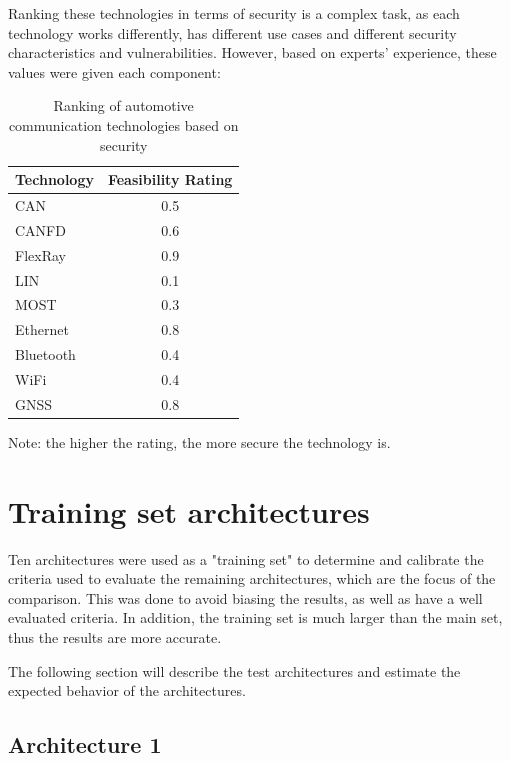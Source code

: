 Ranking these technologies in terms of security is a complex task, as each technology works differently,
has different use cases and different security characteristics and vulnerabilities.
However, based on experts' experience, these values were given each component:

\begin{table}[h]
    \centering
    \begin{tabular}{|l|c|}
    \hline
    \textbf{Technology} & \textbf{Feasibility Rating} \\
    \hline
    CAN & 0.5 \\
    CANFD & 0.6 \\
    FlexRay & 0.9 \\
    LIN & 0.1 \\
    MOST & 0.3 \\
    Ethernet & 0.8 \\
    Bluetooth & 0.4 \\
    WiFi & 0.4 \\
    GNSS & 0.8 \\
    \hline
    \end{tabular}
    \caption{Ranking of automotive communication technologies based on security}
\end{table}

Note: the higher the rating, the more secure the technology is.

\section{Training set architectures}
\label{sec:trainingarch}

Ten architectures were used as a "training set" to determine and calibrate the criteria used to 
evaluate the remaining architectures, which are the focus of the comparison.
This was done to avoid biasing the results, as well as have a well evaluated criteria.
In addition, the training set is much larger than the main set, thus the results are more accurate.

The following section will describe the test architectures and estimate the expected behavior of the architectures.

\subsection{Architecture 1}
\label{subsec:arch1}


